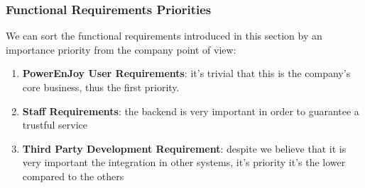 \documentclass[english]{article}
\newcommand{\reqref}[1]{  \hyperlink{R#1}{R.#1} }
\begin{document}
	
\subsubsection{Functional Requirements Priorities}
We can sort the functional requirements introduced in this section by an importance priority from the company point of view:
\begin{enumerate}
	\item \textbf{PowerEnJoy User Requirements}: it's trivial that this is the company's core business, thus the first priority.
	\item \textbf{Staff Requirements}: the backend is very important in order to guarantee a trustful service
	\item \textbf{Third Party Development Requirement}: despite we believe that it is very important the integration in other systems, it's priority it's the lower compared to the others
\end{enumerate}
\end{document}
